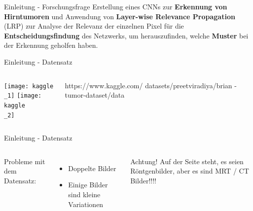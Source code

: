 \documentclass[ngerman,14pt,aspectratio=1610]{beamer}
\begin{document}
		
		\begin{frame}[t]{Einleitung - Forschungsfrage}
			\vspace*{\fill}
			Erstellung eines CNNs zur \textbf{Erkennung von Hirntumoren} und Anwendung von \textbf{Layer-wise Relevance Propagation} (LRP) zur Analyse der Relevanz der einzelnen Pixel für die \textbf{Entscheidungsfindung} des Netzwerks, um herauszufinden, welche \textbf{Muster} bei der Erkennung geholfen haben.
		\end{frame}
		
		\begin{frame}[t]{Einleitung - Datensatz}
			\begin{columns}[T, onlytextwidth]
				\vspace{50pt}
					\texttt{[image: kaggle\\\_1]}
					\texttt{[image: kaggle\\\_2]}
					
				\vspace{70pt}
					https://www.kaggle.com/
					datasets/preetviradiya/brian
					-tumor-dataset/data
			\end{columns}
		\end{frame}
		
		\begin{frame}[t]{Einleitung - Datensatz} 
			\vspace*{\fill}
			\begin{columns}[T, onlytextwidth]
				Probleme mit dem Datensatz:
				\begin{itemize}
					\item Doppelte Bilder
					\item Einige Bilder sind kleine Variationen
				\end{itemize}
				
				\begin{block}{Achtung!}
					Auf der Seite steht, es seien Röntgenbilder, aber es sind MRT / CT Bilder!!!!
				\end{block}
			\end{columns}
		\end{frame}
	
\end{document}
